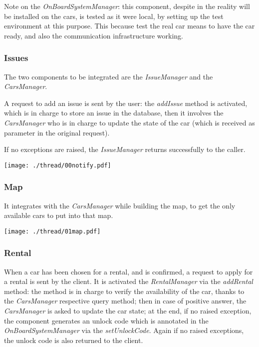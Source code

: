 \documentclass{scrreprt}
\begin{document}
Note on the \emph{OnBoardSystemManager}: this component, despite in the reality will be installed on the cars, is tested as it were local, by setting up the test environment at this purpose. This because test the real car means to have the car ready, and also the communication infrastructure working.


\subsubsection{Issues}
The two components to be integrated are the \emph{IssueManager} and the \emph{CarsManager}.

A request to add an issue is sent by the user: the \emph{addIssue} method is activated, which is in charge to store an issue in the database, then it involves the \emph{CarsManager} who is in charge to update the state of the car (which is received as parameter in the original request).

If no exceptions are raised, the \emph{IssueManager} returns successfully to the caller.

\begin{center}
		\texttt{[image: ./thread/00notify.pdf]}
\end{center}

\subsubsection{Map}
It integrates with the \emph{CarsManager} while building the map, to get the only available cars to put into that map.

\begin{center}
		\texttt{[image: ./thread/01map.pdf]}
\end{center}

\subsubsection{Rental}
When a car has been chosen for a rental, and is confirmed, a request to apply for a rental is sent by the client. It is activated the \emph{RentalManager} via the \emph{addRental} method: the method is in charge to verify the availability of the car, thanks to the \emph{CarsManager} respective query method; then in case of positive answer, the \emph{CarsManager} is asked to update the car state; at the end, if no raised exception, the component generates an unlock code which is annotated in the \emph{OnBoardSystemManager} via the \emph{setUnlockCode}. Again if no raised exceptions, the unlock code is also returned to the client.
\end{document}

